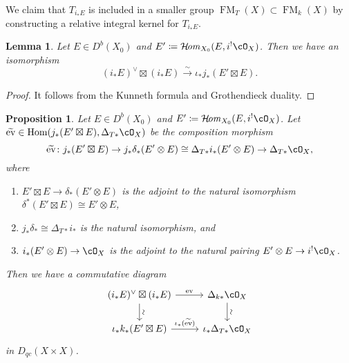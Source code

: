 \documentclass{amsart}
\numberwithin{equation}{section}
\theoremstyle{plain}
\newtheorem{lemma}[theorem]{Lemma}
\newtheorem{proposition}[theorem]{Proposition}
\theoremstyle{definition}
\DeclareMathOperator{\Hom}{\mathrm{Hom}}
\DeclareMathOperator{\CHom}{\mathcal{H}\!\mathit{om}}
\DeclareMathOperator{\ev}{\mathrm{ev}}
\DeclareMathOperator{\FM}{\mathrm{FM}}
\begin{document}
We claim that $T_{i_*E}$ is included in a smaller group $\FM_T(X) \subset \FM_k(X)$ by constructing a relative integral kernel for $T_{i_*E}$.
\begin{lemma}
    Let $E \in D^b(X_0)$ and $E' \coloneqq \CHom_{X_0}(E, i^!\cO_X)$.
    Then we have an isomorphism
    \begin{equation}
        (i_*E)^\vee \boxtimes (i_*E) \xrightarrow{\sim} \iota_*j_*(E' \boxtimes E).
    \end{equation}
\end{lemma}
\begin{proof}
    It follows from the Kunneth formula and Grothendieck duality.
\end{proof}
\begin{proposition}
    Let $E \in D^b(X_0)$ and $E' \coloneqq \CHom_{X_0}(E, i^!\cO_X)$.
    Let $\widetilde{\ev} \in \Hom(j_*(E' \boxtimes E), \Delta_{T*}\cO_X)$ be the composition morphism
    \begin{equation}
        \widetilde{\ev} \colon j_*(E' \boxtimes E) \to j_*\delta_*(E' \otimes E)\cong \Delta_{T*}i_*(E' \otimes E) \to \Delta_{T*}\cO_X,
    \end{equation}
    where
    \begin{enumerate}
        \item $E' \boxtimes E \to \delta_*(E' \otimes E)$ is the adjoint to the natural isomorphism $\delta^*(E' \boxtimes E) \cong E' \otimes E$,
        \item $j_*\delta_* \cong \Delta_{T*}i_*$ is the natural isomorphism, and
        \item $i_*(E' \otimes E) \to \cO_X$ is the adjoint to the natural pairing $E' \otimes E \to i^!\cO_X$.
    \end{enumerate}
    Then we have a commutative diagram
    \begin{equation}
        \begin{tikzcd}\label{eq:commutative-diagram-for-evaluation-map}
            (i_*E)^\vee \boxtimes (i_*E)\ar[r, "\ev"] \ar[d, "\sim", sloped] & \Delta_{k*}\cO_X \ar[d, "\sim", sloped]\\
            \iota_*k_*(E' \boxtimes E) \ar[r, "\iota_*(\widetilde{\ev})"]& \iota_*\Delta_{T*}\cO_X
        \end{tikzcd}
    \end{equation}
    in $D_{qc}(X \times X)$.
\end{proposition}
\end{document}
